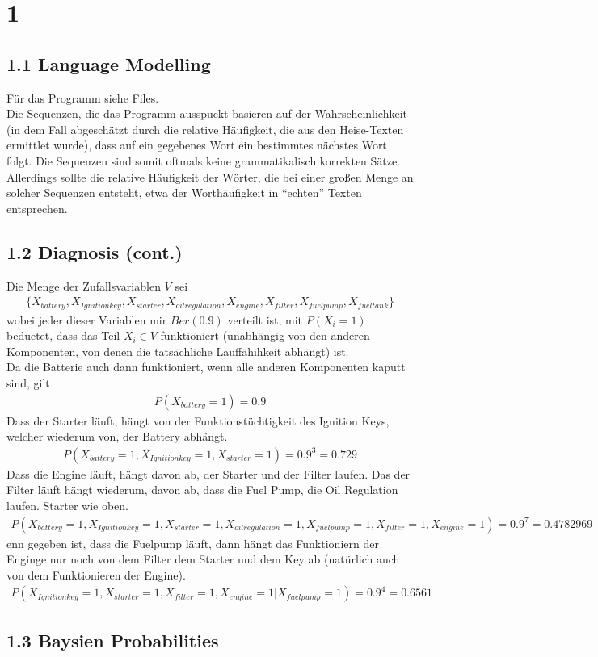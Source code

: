 \documentclass[a4paper,11pt,fleqn]{scrartcl}
\title{\titleinfo}
\author{\authorinfo}
\begin{document}
\maketitle
\notag

\section*{1}
\subsection*{1.1 Language Modelling}
Für das Programm siehe Files.\\
Die Sequenzen, die das Programm ausspuckt basieren auf der Wahrscheinlichkeit (in dem Fall abgeschätzt durch die relative Häufigkeit, die aus den Heise-Texten ermittlet wurde), dass auf ein gegebenes Wort ein bestimmtes nächstes Wort folgt. Die Sequenzen sind somit oftmals keine grammatikalisch korrekten Sätze. 
Allerdings sollte die relative Häufigkeit der Wörter, die bei einer großen Menge an solcher Sequenzen entsteht, etwa der Worthäufigkeit in ``echten'' Texten entsprechen.
\subsection*{1.2 Diagnosis (cont.) }
Die Menge der Zufallsvariablen $V$ sei
\begin{align*}
  \{X_{battery},X_{Ignition key}, X_{starter},X_{oil regulation},X_{engine}, X_{filter}, X_{fuel pump}, X_{fuel tank}\}
\end{align*}
wobei jeder dieser Variablen mir $Ber(0.9)$ verteilt ist, mit $P(X_i=1)$ beduetet, dass das Teil $X_i \in V$ funktioniert (unabhängig von den anderen Komponenten, von denen die tatsächliche  Lauffähihkeit abhängt) ist.\\
Da die Batterie auch dann funktioniert, wenn alle anderen Komponenten kaputt sind, gilt
\begin{align*}
P(X_{battery} = 1) = 0.9
\end{align*}
Dass der Starter läuft, hängt von der Funktionstüchtigkeit des Ignition Keys, welcher wiederum von, der Battery abhängt.
\begin{align*}
P(X_{battery} = 1, X_{Ignition key} = 1, X_{starter} = 1) = 0.9^3 = 0.729
\end{align*}
Dass die Engine läuft, hängt davon ab, der Starter und der Filter laufen. Das der Filter läuft hängt wiederum, davon ab, dass die Fuel Pump, die Oil Regulation laufen. Starter wie oben.
\begin{align*}
P(X_{battery} = 1, X_{Ignition key} = 1, X_{starter} = 1, X_{oil regulation} = 1, X_{fuel pump} = 1, X_{filter} = 1, X_{engine} = 1)  = 0.9^7 = 0.4782969
\end{align*} 
enn gegeben ist, dass die Fuelpump läuft, dann hängt das Funktioniern der Enginge nur noch von dem Filter dem Starter und dem Key ab (natürlich auch von dem Funktionieren der Engine).
\begin{align*}
P(X_{Ignition key} = 1, X_{starter} = 1, X_{filter} = 1, X_{engine} = 1 \vert X_{fuel pump} = 1 )  = 0.9^4 = 0.6561 
\end{align*} 
\subsection*{1.3 Baysien Probabilities}
\end{document}
